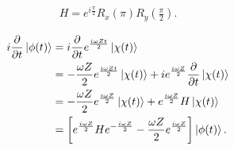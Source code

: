 \begin{ex}
    \label{ex7.31}
    \begin{align*}
        H = e^{i \frac{\pi}{2}} R_x \left( \pi\right) R_y \left( \frac{\pi}{2}\right).
    \end{align*}
\end{ex}

\begin{ex}
    \label{ex7.32}

\end{ex}

\begin{ex}
    \label{ex7.33}
    \begin{align*}
        i \frac{\partial}{\partial t} \ket{\phi(t)}
         & =
        i \frac{\partial}{\partial t} e^{\frac{i \omega Z t}{2}} \ket{ \chi(t)} \\
         & =
        - \frac{\omega Z}{2} e^{\frac{i \omega Z t}{2}}\ket{\chi(t)}
        +
        i e^{\frac{i \omega Z}{2}} \frac{\partial}{\partial t}\ket{ \chi(t)}    \\
         & =
        - \frac{\omega Z}{2} e^{\frac{i \omega Z}{2}} \ket{\chi(t)}
        +
        e^{\frac{i \omega Z}{2}} H \ket{\chi(t)}                                \\
         & =
        \left[e^{\frac{i \omega Z}{2}} H e^{ -\frac{i \omega Z}{2}} - \frac{\omega Z}{2} e^{\frac{i \omega Z}{2}} \right] \ket{\phi(t)}.
    \end{align*}
\end{ex}

